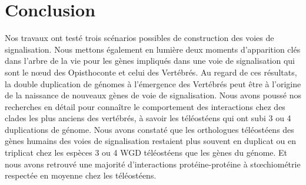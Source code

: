 \chapter{Conclusion}
\thispagestyle{firstpage}
\onehalfspacing

\par Nos travaux ont testé trois scénarios possibles de construction des voies de signalisation. Nous mettons également en lumière deux moments d’apparition clés dans l’arbre de la vie pour les gènes impliqués dans une voie de signalisation qui sont le nœud des Opisthoconte et celui des Vertébrés. Au regard de ces résultats, la double duplication de génomes à l’émergence des Vertébrés peut être à l’origine de la naissance de nouveaux gènes de voie de signalisation. Nous avons poussé nos recherches en détail pour connaître le comportement des interactions chez des clades les plus anciens des vertébrés, à savoir les téléostéens qui ont subi 3 ou 4 duplications de génome. Nous avons constaté que les orthologues téléostéens des gènes humains des voies de signalisation restaient plus souvent en duplicat ou en triplicat chez les espèces 3 ou 4 WGD téléostéens que les gènes du génome. Et nous avons retrouvé une majorité d’interactions protéine-protéine à stœchiométrie respectée en moyenne chez les téléostéens. 